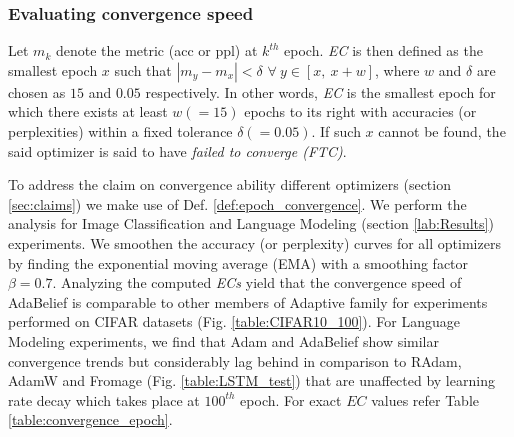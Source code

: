 \subsubsection{Evaluating convergence speed}
\label{lab:convergence_speed}
\begin{definition}
Let $m_k$ denote the metric (acc or ppl) at $k^{th}$ epoch. \textit{EC} is then defined as the smallest epoch $x$ such that $|m_y - m_x| < \delta$ $ \forall\ y \in [x,\ x + w]$, where $w$ and $\delta$ are chosen as $15$ and $0.05$ respectively. In other words, \textit{EC} is the smallest epoch for which there exists at least $w(=15)$ epochs to its right with accuracies (or perplexities) within a fixed tolerance $\delta(=0.05)$. If such $x$ cannot be found, the said optimizer is said to have \textit{failed to converge (FTC)}.
\label{def:epoch_convergence}
\end{definition}
To address the claim on convergence ability different optimizers (section \ref{sec:claims}) we make use of Def. \ref{def:epoch_convergence}. We perform the analysis for Image Classification and Language Modeling (section \ref{lab:Results}) experiments. We smoothen the accuracy (or perplexity) curves for all optimizers by finding the exponential moving average (EMA) with a smoothing factor $\beta=0.7$. Analyzing the computed \textit{ECs} yield that the convergence speed of AdaBelief is comparable to other members of Adaptive family for experiments performed on CIFAR datasets (Fig. \ref{table:CIFAR10_100}). For Language Modeling experiments, we find that Adam and AdaBelief show similar convergence trends but considerably lag behind in comparison to RAdam, AdamW and Fromage (Fig. \ref{table:LSTM_test}) that are unaffected by learning rate decay which takes place at $100^{th}$ epoch. For exact $EC$ values refer Table \ref{table:convergence_epoch}.

    

	
 

